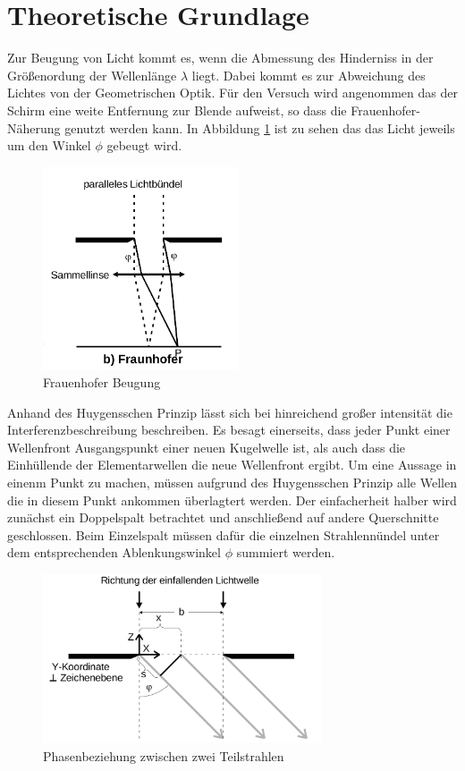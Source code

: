 \section{Theoretische Grundlage}
\label{sec:Theorie}
Zur Beugung von Licht kommt es, wenn die Abmessung des Hinderniss in der Größenordung der Wellenlänge $\lambda$ liegt. Dabei kommt es zur Abweichung des Lichtes von der Geometrischen Optik. Für den Versuch wird angenommen das der Schirm eine weite Entfernung zur  Blende aufweist, so dass die Frauenhofer-Näherung genutzt werden kann. In Abbildung \ref{fig:Fra} ist zu sehen das das Licht jeweils um den Winkel $\phi$ gebeugt wird.
\begin{figure}
  \centering
  \includegraphics[height=6cm]{picture/Frauenhofer.png}
  \caption{Frauenhofer Beugung}
  \label{fig:Fra}
\end{figure}
Anhand des Huygensschen Prinzip lässt sich bei hinreichend großer intensität die Interferenzbeschreibung beschreiben. Es besagt einerseits, dass jeder Punkt einer Wellenfront Ausgangspunkt einer neuen Kugelwelle ist, als auch dass die Einhüllende der Elementarwellen die neue Wellenfront ergibt. Um eine Aussage in einenm Punkt zu machen, müssen aufgrund des Huygensschen Prinzip alle Wellen die in diesem Punkt ankommen überlagtert werden. Der einfacherheit halber wird zunächst ein Doppelspalt betrachtet und anschließend auf andere Querschnitte geschlossen. Beim Einzelspalt müssen dafür die einzelnen Strahlennündel  unter dem entsprechenden Ablenkungswinkel $\phi$ summiert werden.
\begin{figure}
  \centering
  \includegraphics[height=5cm]{picture/doppelspalt.png}
  \caption{Phasenbeziehung zwischen zwei Teilstrahlen}
  \label{fig:dop}
\end{figure}
